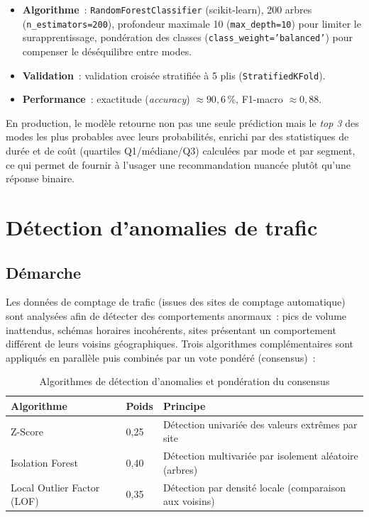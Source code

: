 \begin{itemize}
\item \textbf{Algorithme}~: \texttt{RandomForestClassifier} (scikit-learn), 200 arbres (\texttt{n\_estimators=200}), profondeur maximale 10 (\texttt{max\_depth=10}) pour limiter le surapprentissage, pondération des classes (\texttt{class\_weight='balanced'}) pour compenser le déséquilibre entre modes.
\item \textbf{Validation}~: validation croisée stratifiée à 5 plis (\texttt{StratifiedKFold}).
\item \textbf{Performance}~: exactitude (\emph{accuracy}) $\approx 90{,}6\,\%$, F1-macro $\approx 0{,}88$.
\end{itemize}

En production, le modèle retourne non pas une seule prédiction mais le \emph{top 3} des modes les plus probables avec leurs probabilités, enrichi par des statistiques de durée et de coût (quartiles Q1/médiane/Q3) calculées par mode et par segment, ce qui permet de fournir à l'usager une recommandation nuancée plutôt qu'une réponse binaire.

\section{Détection d'anomalies de trafic}

\subsection{Démarche}
Les données de comptage de trafic (issues des sites de comptage automatique) sont analysées afin de détecter des comportements anormaux~: pics de volume inattendus, schémas horaires incohérents, sites présentant un comportement différent de leurs voisins géographiques. Trois algorithmes complémentaires sont appliqués en parallèle puis combinés par un vote pondéré (consensus)~:

\begin{table}[H]
\centering
\caption{Algorithmes de détection d'anomalies et pondération du consensus}
\begin{tabular}{p{3cm}p{2cm}p{8cm}}
\toprule
\textbf{Algorithme} & \textbf{Poids} & \textbf{Principe} \\
\midrule
Z-Score & 0,25 & Détection univariée des valeurs extrêmes par site \\
Isolation Forest & 0,40 & Détection multivariée par isolement aléatoire (arbres) \\
Local Outlier Factor (LOF) & 0,35 & Détection par densité locale (comparaison aux voisins) \\
\bottomrule
\end{tabular}
\end{table}

